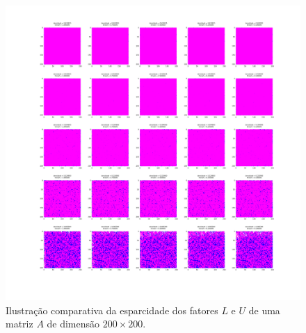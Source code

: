 \documentclass[12pt,a4paper]{article}
\begin{document}
\begin{figure}[!htb]
    \begin{center}
        \includegraphics[width=\textwidth, trim=300 300 250 100, clip]{src/dim200.png}
    \end{center}
    \caption{Ilustração comparativa da esparcidade dos fatores $L$ e $U$ de uma
    matriz $A$ de dimensão $200 \times 200$.}
    \label{fig:dim200}
\end{figure}
\end{document}

